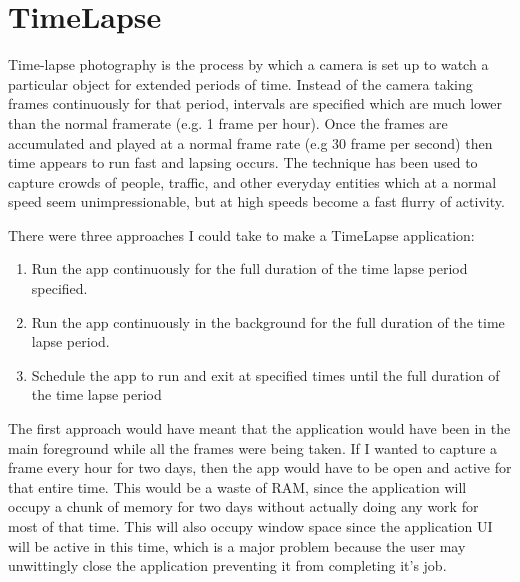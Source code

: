 %
%
%
%

\part{TimeLapse}
Time-lapse photography is the process by which a camera is set up to watch a particular object for extended periods of time. Instead of the camera taking frames continuously for that period, intervals are specified which are much lower than the normal framerate (e.g. 1 frame per hour). Once the frames are accumulated and played at a normal frame rate (e.g 30 frame per second) then time appears to run fast and lapsing occurs.
The technique has been used to capture crowds of people, traffic, and other everyday entities which at a normal speed seem unimpressionable, but at high speeds become a fast flurry of activity.

There were three approaches I could take to make a TimeLapse application:\\
\begin{enumerate}
\vspace{-20pt}
\item Run the app continuously for the full duration of the time lapse period specified.\\
\vspace{-20pt}
\item Run the app continuously in the background for the full duration of the time lapse period.\\
\vspace{-20pt}
\item Schedule the app to run and exit at specified times until the full duration of the time lapse period\\
\vspace{-10pt}
\end{enumerate}

The first approach would have meant that the application would have been in the main foreground while all the frames were being taken. If I wanted to capture a frame every hour for two days, then the app would have to be open and active for that entire time. This would be a waste of RAM, since the application will occupy a chunk of memory for two days without actually doing any work for most of that time. This will also occupy window space since the application UI will be active in this time, which is a major problem because the user may unwittingly close the application preventing it from completing it's job.

